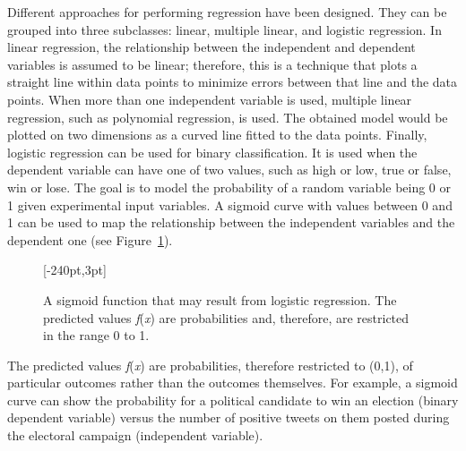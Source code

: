 Different approaches for performing regression have been designed. They can be grouped into three subclasses: linear, multiple linear, and logistic regression. In linear regression, the relationship between the independent and dependent variables is assumed to be linear; therefore, this is a technique that plots a straight line within data points to minimize errors between that line and the data points. When more than one independent variable is used, multiple linear regression, such as polynomial regression, is used. The obtained model would be plotted on two dimensions as a curved line fitted to the data points. Finally, logistic regression can be used for binary classification. It is used when the dependent variable can have one of two values, such as high or low, true or false, win or lose. The goal is to model the probability of a random variable being 0 or 1 given experimental input variables. A sigmoid curve with values between 0 and 1 can be used to map the relationship between the independent variables and the dependent one (see Figure~\ref{fig:4.1}).


\begin{figure}[t!]
[-240pt,3pt]
\caption{\label{fig:4.1}A sigmoid function that may result from logistic regression. The predicted values \textit{f}(\textit{x}) are probabilities and, therefore, are restricted in the range 0 to 1.}
\end{figure}

The predicted values \textit{f}(\textit{x}) are probabilities, therefore restricted to (0,1), of particular outcomes rather than the outcomes themselves. For example, a sigmoid curve can show the probability for a political candidate to win an election (binary dependent variable) versus the number of positive tweets on them posted during the electoral campaign (independent variable).

